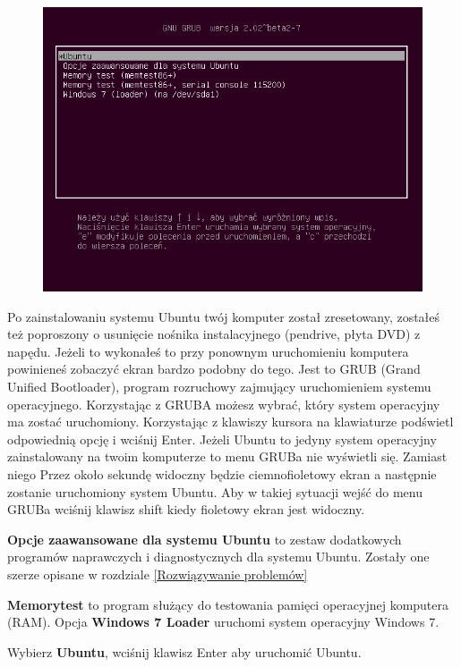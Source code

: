 \label{pierwsze_uruchomienie}
\begin{figure}
                \includegraphics[width=\linewidth]{images/pierwsze_uruchomienie_grub.png}
\end{figure}

Po zainstalowaniu systemu Ubuntu twój komputer został zresetowany, zostałeś też poproszony o usunięcie nośnika instalacyjnego (pendrive, płyta DVD) z napędu. Jeżeli to wykonałeś to przy ponownym uruchomieniu komputera powinieneś zobaczyć ekran bardzo podobny do tego. Jest to GRUB (Grand Unified Bootloader), program rozruchowy zajmujący uruchomieniem systemu operacyjnego. Korzystając z GRUBA możesz wybrać, który system operacyjny ma zostać uruchomiony. Korzystając z klawiszy kursora na klawiaturze podświetl odpowiednią opcję i wciśnij Enter.
Jeżeli Ubuntu to jedyny system operacyjny zainstalowany na twoim komputerze to menu GRUBa nie wyświetli się. Zamiast niego Przez około sekundę widoczny będzie ciemnofioletowy ekran a następnie zostanie uruchomiony system Ubuntu. Aby w takiej sytuacji wejść do menu GRUBa wciśnij klawisz shift kiedy fioletowy ekran jest widoczny.

\textbf{Opcje zaawansowane dla systemu Ubuntu} to zestaw dodatkowych programów naprawczych i diagnostycznych dla systemu Ubuntu. Zostały one szerze opisane w rozdziale \ref{Rozwiązywanie problemów}

\textbf{Memorytest} to program służący do testowania pamięci operacyjnej komputera (RAM).
Opcja \textbf{Windows 7 Loader} uruchomi system operacyjny Windows 7.

\begin{flushright}
Wybierz \textbf{Ubuntu}, wciśnij klawisz Enter aby uruchomić Ubuntu.
\end{flushright}
\clearpage
